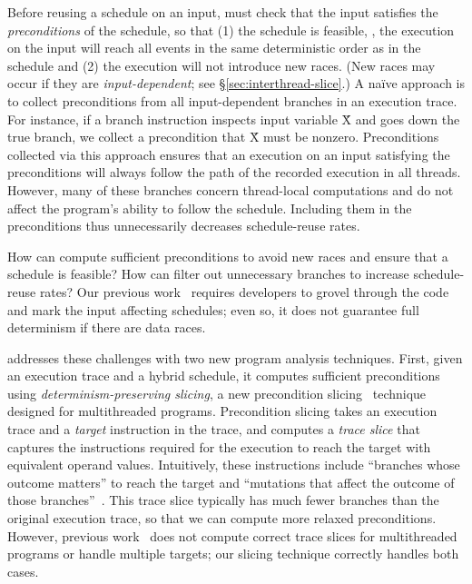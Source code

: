 Before reusing a schedule on an input, \peregrine must check that the input
satisfies the \emph{preconditions} of the schedule, so that (1) the
schedule is feasible, \ie, the execution on the input will reach all
events in the same deterministic order as in the schedule and (2) the
execution will not introduce new races. (New races may occur if they are
\emph{input-dependent}; see \S\ref{sec:interthread-slice}.)  A na\"ive
approach is to collect preconditions from all input-dependent branches in
an execution trace.  For instance, if a branch instruction inspects
input variable \v{X} and goes down the true branch, we collect a
precondition that \v{X} must be nonzero.  Preconditions collected via
this approach ensures that an execution on an input satisfying the
preconditions will always follow the path of the recorded execution in all
threads.  However, many of these branches concern thread-local
computations and do not affect the program's ability to follow the
schedule. Including them in the preconditions thus unnecessarily decreases
schedule-reuse rates.

How can \peregrine compute sufficient preconditions to avoid new races and
ensure that a schedule is feasible?  How can \peregrine filter out unnecessary
branches to increase schedule-reuse rates?  Our previous
work~\cite{cui:tern:osdi10} requires developers to grovel through the
code and mark the input affecting schedules; even so, it does not
guarantee full determinism if there are data races.

\peregrine addresses these challenges with two new
program analysis techniques.  First, given an execution trace and a hybrid
schedule, it computes sufficient preconditions using
\emph{determinism-preserving slicing}, a new precondition
slicing~\cite{castro:bouncer} technique designed for multithreaded
programs.  Precondition slicing takes an execution trace and a
\emph{target} instruction in the trace, and computes 
a \emph{trace slice} that captures the instructions required for the
execution to reach the target with equivalent operand
values.  Intuitively, these instructions include ``branches whose
  outcome matters'' to reach the target and ``mutations that affect the
  outcome of those branches''~\cite{castro:bouncer}.  This trace slice
typically has much fewer branches than the original execution trace,
so that we can compute more relaxed preconditions.  However, previous
work~\cite{castro:bouncer} does not compute correct trace slices for
multithreaded programs or handle multiple targets; our slicing
technique correctly handles both cases.

